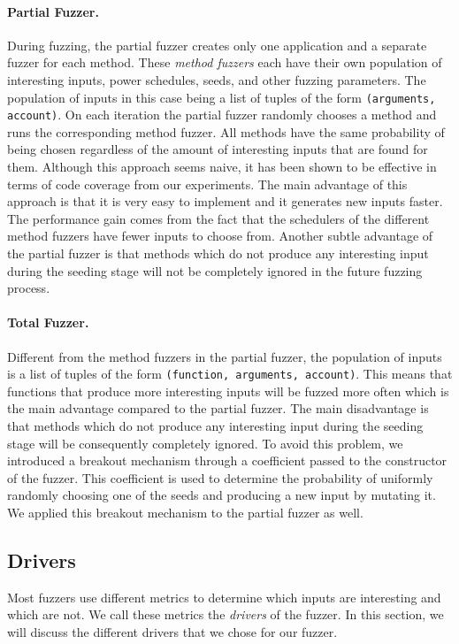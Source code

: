 \paragraph{Partial Fuzzer.} During fuzzing, the partial fuzzer creates only one application and a separate fuzzer for each method.
These \textit{method fuzzers} each have their own population of interesting inputs, power schedules, seeds, and other fuzzing parameters.
The population of inputs in this case being a list of tuples of the form \texttt{(arguments, account)}.
On each iteration the partial fuzzer randomly chooses a method and runs the corresponding method fuzzer.
All methods have the same probability of being chosen regardless of the amount of interesting inputs that are found for them.
Although this approach seems naive, it has been shown to be effective in terms of code coverage from our experiments.
The main advantage of this approach is that it is very easy to implement and it generates new inputs faster.
The performance gain comes from the fact that the schedulers of the different method fuzzers have fewer inputs to choose from.
Another subtle advantage of the partial fuzzer is that methods which do not produce any interesting input during the seeding stage will not be completely ignored in the future fuzzing process.

\paragraph{Total Fuzzer.} Different from the method fuzzers in the partial fuzzer, the population of inputs is a list of tuples of the form \texttt{(function, arguments, account)}.
This means that functions that produce more interesting inputs will be fuzzed more often which is the main advantage compared to the partial fuzzer.
The main disadvantage is that methods which do not produce any interesting input during the seeding stage will be consequently completely ignored.
To avoid this problem, we introduced a breakout mechanism through a coefficient passed to the constructor of the fuzzer.
This coefficient is used to determine the probability of uniformly randomly choosing one of the seeds and producing a new input by mutating it.
We applied this breakout mechanism to the partial fuzzer as well.



\subsection*{Drivers}\label{section:drivers}
Most fuzzers use different metrics to determine which inputs are interesting and which are not.
We call these metrics the \textit{drivers} of the fuzzer.
In this section, we will discuss the different drivers that we chose for our fuzzer.


